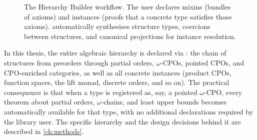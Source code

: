 \begin{figure}[h]
\centering
{}
\caption{The Hierarchy Builder workflow.  The user declares mixins
  (bundles of axioms) and instances (proofs that a concrete type
  satisfies those axioms).  \HB{} automatically synthesises structure
  types, coercions between structures, and canonical projections for
  instance resolution.}
\label{fig:hb-workflow}
\end{figure}

In this thesis, the entire algebraic hierarchy is declared via \HB{}: the
chain of structures from preorders through partial orders, $\omega$-CPOs,
pointed CPOs, and CPO-enriched categories, as well as all concrete
instances (product CPOs, function spaces, the lift monad, discrete
orders, and so on).  The practical consequence is that when a type is
registered as, say, a pointed $\omega$-CPO, every theorem about partial
orders, $\omega$-chains, and least upper bounds becomes automatically
available for that type, with no additional declarations required by the
library user.  The specific hierarchy and the design decisions behind it
are described in \cref{ch:methods}.
